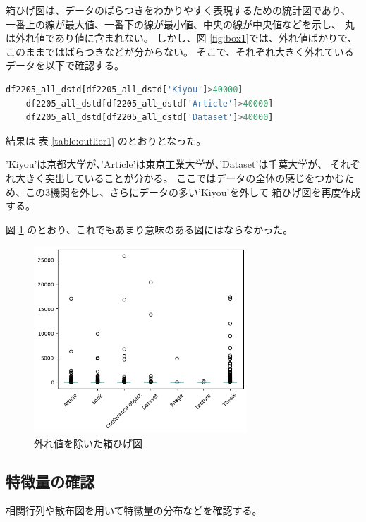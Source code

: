 \documentclass[submit,noauthor]{ono}
\begin{document}
箱ひげ図は、データのばらつきをわかりやすく表現するための統計図であり、
一番上の線が最大値、一番下の線が最小値、中央の線が中央値などを示し、
丸は外れ値であり値に含まれない。
しかし、図 \ref{fig:box1}では、外れ値ばかりで、このままではばらつきなどが分からない。
そこで、それぞれ大きく外れているデータを以下で確認する。

\begin{lstlisting}[language=Python,breaklines]
	df2205_all_dstd[df2205_all_dstd['Kiyou']>40000]
	df2205_all_dstd[df2205_all_dstd['Article']>40000]
	df2205_all_dstd[df2205_all_dstd['Dataset']>40000]
\end{lstlisting}

結果は
表 \ref{table:outlier1}
のとおりとなった。

'Kiyou'は京都大学が、'Article'は東京工業大学が、'Dataset'は千葉大学が、
それぞれ大きく突出していることが分かる。
ここではデータの全体の感じをつかむため、この3機関を外し、さらにデータの多い'Kiyou'を外して
箱ひげ図を再度作成する。

図 \ref{fig:box2} のとおり、これでもあまり意味のある図にはならなかった。

\begin{figure}[h]
	\includegraphics[width=8cm]{./picture/box2.png}
	\caption{外れ値を除いた箱ひげ図}
	\label{fig:box2}
\end{figure}

\subsection{特徴量の確認}

相関行列や散布図を用いて特徴量の分布などを確認する。
\end{document}
